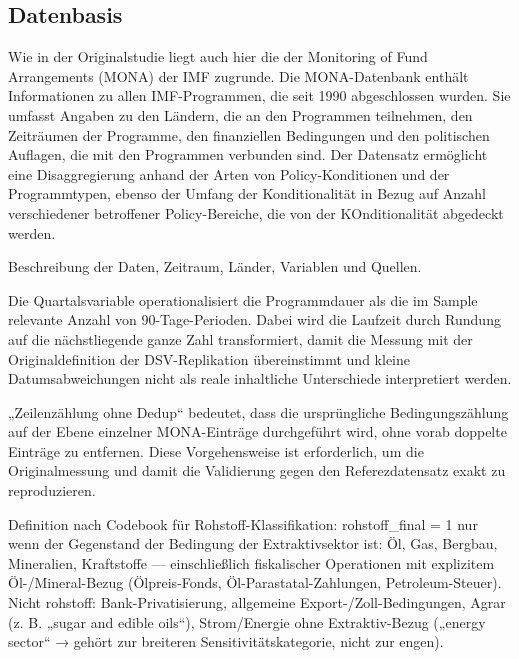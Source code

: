 
\subsection{Datenbasis}

Wie in der Originalstudie liegt auch hier die der Monitoring of Fund Arrangements (MONA) der IMF zugrunde. Die MONA-Datenbank enthält Informationen zu allen IMF-Programmen, die seit 1990 abgeschlossen wurden. Sie umfasst Angaben zu den Ländern, die an den Programmen teilnehmen, den Zeiträumen der Programme, den finanziellen Bedingungen und den politischen Auflagen, die mit den Programmen verbunden sind. Der Datensatz ermöglicht eine Disaggregierung anhand der Arten von Policy-Konditionen und der Programmtypen, ebenso der Umfang der Konditionalität in Bezug auf Anzahl verschiedener betroffener Policy-Bereiche, die von der KOnditionalität abgedeckt werden. 

Beschreibung der Daten, Zeitraum, Länder, Variablen und Quellen.

Die Quartalsvariable operationalisiert die Programmdauer als die im Sample relevante Anzahl von 90-Tage-Perioden. Dabei wird die Laufzeit durch Rundung auf die nächstliegende ganze Zahl transformiert, damit die Messung mit der Originaldefinition der DSV-Replikation übereinstimmt und kleine Datumsabweichungen nicht als reale inhaltliche Unterschiede interpretiert werden.

„Zeilenzählung ohne Dedup“ bedeutet, dass die ursprüngliche Bedingungszählung auf der Ebene einzelner MONA-Einträge durchgeführt wird, ohne vorab doppelte Einträge zu entfernen. Diese Vorgehensweise ist erforderlich, um die Originalmessung und damit die Validierung gegen den Referezdatensatz exakt zu reproduzieren.

Definition nach Codebook für Rohstoff-Klassifikation:
rohstoff\_final = 1 nur wenn der Gegenstand der Bedingung der Extraktivsektor ist: Öl, Gas, Bergbau, Mineralien, Kraftstoffe — einschließlich fiskalischer Operationen mit explizitem Öl-/Mineral-Bezug (Ölpreis-Fonds, Öl-Parastatal-Zahlungen, Petroleum-Steuer).
Nicht rohstoff: Bank-Privatisierung, allgemeine Export-/Zoll-Bedingungen, Agrar (z. B. „sugar and edible oils“), Strom/Energie ohne Extraktiv-Bezug („energy sector“ → gehört zur breiteren Sensitivitätskategorie, nicht zur engen).

